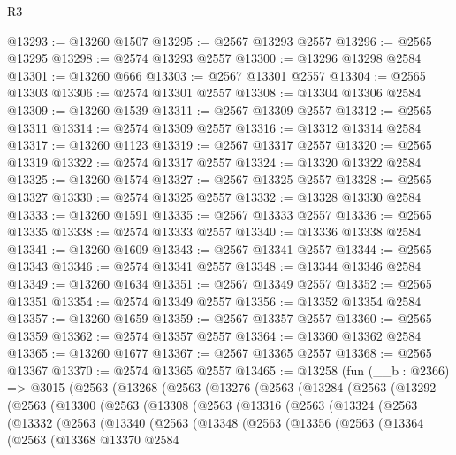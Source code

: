 \begin{lexlean}{R3}
\begin{coremodule}
@13293 := @13260 @1507
@13295 := @2567 @13293 @2557
@13296 := @2565 @13295
@13298 := @2574 @13293 @2557
@13300 := @13296 @13298 @2584
@13301 := @13260 @666
@13303 := @2567 @13301 @2557
@13304 := @2565 @13303
@13306 := @2574 @13301 @2557
@13308 := @13304 @13306 @2584
@13309 := @13260 @1539
@13311 := @2567 @13309 @2557
@13312 := @2565 @13311
@13314 := @2574 @13309 @2557
@13316 := @13312 @13314 @2584
@13317 := @13260 @1123
@13319 := @2567 @13317 @2557
@13320 := @2565 @13319
@13322 := @2574 @13317 @2557
@13324 := @13320 @13322 @2584
@13325 := @13260 @1574
@13327 := @2567 @13325 @2557
@13328 := @2565 @13327
@13330 := @2574 @13325 @2557
@13332 := @13328 @13330 @2584
@13333 := @13260 @1591
@13335 := @2567 @13333 @2557
@13336 := @2565 @13335
@13338 := @2574 @13333 @2557
@13340 := @13336 @13338 @2584
@13341 := @13260 @1609
@13343 := @2567 @13341 @2557
@13344 := @2565 @13343
@13346 := @2574 @13341 @2557
@13348 := @13344 @13346 @2584
@13349 := @13260 @1634
@13351 := @2567 @13349 @2557
@13352 := @2565 @13351
@13354 := @2574 @13349 @2557
@13356 := @13352 @13354 @2584
@13357 := @13260 @1659
@13359 := @2567 @13357 @2557
@13360 := @2565 @13359
@13362 := @2574 @13357 @2557
@13364 := @13360 @13362 @2584
@13365 := @13260 @1677
@13367 := @2567 @13365 @2557
@13368 := @2565 @13367
@13370 := @2574 @13365 @2557
@13465 := @13258
    (fun (__b : @2366) =>
    @3015
      (@2563
        (@13268
          (@2563
            (@13276
              (@2563
                (@13284
                  (@2563
                    (@13292
                      (@2563
                        (@13300
                          (@2563
                            (@13308
                              (@2563
                                (@13316
                                  (@2563
                                    (@13324
                                      (@2563
                                        (@13332
                                          (@2563
                                            (@13340
                                              (@2563
                                                (@13348
                                                  (@2563
                                                    (@13356
                                                      (@2563
                                                        (@13364
                                                          (@2563
                                                            (@13368
                                                              @13370
                                                              @2584

\end{coremodule}
\end{lexlean}
